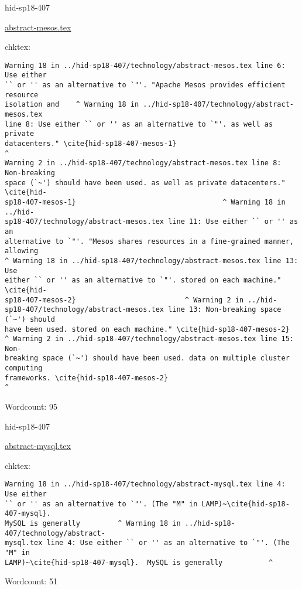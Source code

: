 

\begin{IU}

hid-sp18-407

\href{https://github.com/cloudmesh-community/hid-sp18-407/blob/master//technology/abstract-mesos.tex}{abstract-mesos.tex}

 
chktex:
\begin{tiny}
\begin{verbatim}
Warning 18 in ../hid-sp18-407/technology/abstract-mesos.tex line 6: Use either
`` or '' as an alternative to `"'. "Apache Mesos provides efficient resource
isolation and    ^ Warning 18 in ../hid-sp18-407/technology/abstract-mesos.tex
line 8: Use either `` or '' as an alternative to `"'. as well as private
datacenters." \cite{hid-sp18-407-mesos-1}                                  ^
Warning 2 in ../hid-sp18-407/technology/abstract-mesos.tex line 8: Non-breaking
space (`~') should have been used. as well as private datacenters." \cite{hid-
sp18-407-mesos-1}                                   ^ Warning 18 in ../hid-
sp18-407/technology/abstract-mesos.tex line 11: Use either `` or '' as an
alternative to `"'. "Mesos shares resources in a fine-grained manner, allowing
^ Warning 18 in ../hid-sp18-407/technology/abstract-mesos.tex line 13: Use
either `` or '' as an alternative to `"'. stored on each machine." \cite{hid-
sp18-407-mesos-2}                          ^ Warning 2 in ../hid-
sp18-407/technology/abstract-mesos.tex line 13: Non-breaking space (`~') should
have been used. stored on each machine." \cite{hid-sp18-407-mesos-2}
^ Warning 2 in ../hid-sp18-407/technology/abstract-mesos.tex line 15: Non-
breaking space (`~') should have been used. data on multiple cluster computing
frameworks. \cite{hid-sp18-407-mesos-2}
^
\end{verbatim}
\end{tiny}

Wordcount: 95

\end{IU}



\begin{IU}

hid-sp18-407

\href{https://github.com/cloudmesh-community/hid-sp18-407/blob/master//technology/abstract-mysql.tex}{abstract-mysql.tex}

 
chktex:
\begin{tiny}
\begin{verbatim}
Warning 18 in ../hid-sp18-407/technology/abstract-mysql.tex line 4: Use either
`` or '' as an alternative to `"'. (The "M" in LAMP)~\cite{hid-sp18-407-mysql}.
MySQL is generally         ^ Warning 18 in ../hid-sp18-407/technology/abstract-
mysql.tex line 4: Use either `` or '' as an alternative to `"'. (The "M" in
LAMP)~\cite{hid-sp18-407-mysql}.  MySQL is generally           ^
\end{verbatim}
\end{tiny}

Wordcount: 51

\end{IU}

